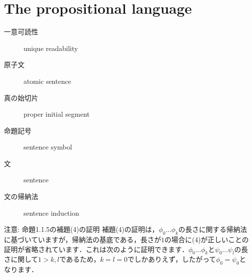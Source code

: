 \section{The propositional language}

\begin{myfrm}[訳語対応]
  \begin{description}
    \item[一意可読性] unique readability
    \item[原子文] atomic sentence
    \item[真の始切片] proper initial segment
    \item[命題記号] sentence symbol
    \item[文] sentence
    \item[文の帰納法] sentence induction
  \end{description}
\end{myfrm}



\begin{excfield}{注意: 命題1.1.5の補題(4)の証明}
  補題(4)の証明は，$\phi_0 \dots \phi_k$の長さに関する帰納法に基づいていますが，帰納法の基底である，長さが$1$の場合に(4)が正しいことの証明が省略されています．これは次のように証明できます．$\phi_0 \dots \phi_k$と$\psi_0 \dots \psi_l$の長さに関して$1 > k, l$であるため，$k = l = 0$でしかありえず，したがって$\phi_0 = \psi_0$となります．
\end{excfield}



